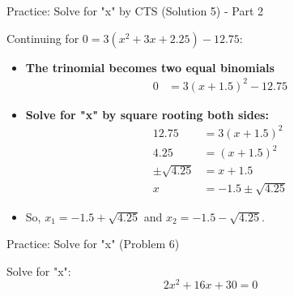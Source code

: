 \documentclass[aspectratio=169]{beamer}
\begin{document}
\begin{frame}{Practice: Solve for "x" by CTS (Solution 5) - Part 2}
    \begin{tcolorbox}[colback=lightgray,colframe=accent,title=Solution 5 - Part 2 (Cont.)]
        \footnotesize
        Continuing for $0 = 3(x^2 + 3x + 2.25) - 12.75$:
        \begin{itemize}
            \item \textbf{The trinomial becomes two equal binomials}
                \begin{align*}
                    0 &= 3(x+1.5)^2 - 12.75
                \end{align*}
            \item \textbf{Solve for "x" by square rooting both sides:}
                \begin{align*}
                    12.75 &= 3(x+1.5)^2 \\
                    4.25 &= (x+1.5)^2 \\
                    \pm\sqrt{4.25} &= x+1.5 \\
                    x &= -1.5 \pm\sqrt{4.25}
                \end{align*}
            \item So, $x_1 = -1.5 + \sqrt{4.25}$ and $x_2 = -1.5 - \sqrt{4.25}$.
        \end{itemize}
    \end{tcolorbox}
\end{frame}

\begin{frame}{Practice: Solve for "x" (Problem 6)}
    \begin{tcolorbox}[colback=lightgray,colframe=primary,title=Problem 6]
        \footnotesize
        Solve for "x":
        \[ 2x^2 + 16x + 30 = 0 \]
    \end{tcolorbox}
\end{frame}
\end{document}

